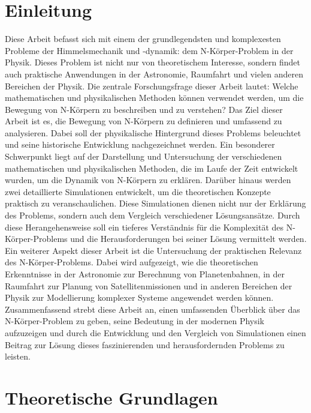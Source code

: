 \documentclass[a4paper,12pt,twoside]{article}
\begin{document}
\section{Einleitung}
Diese Arbeit befasst sich mit einem der grundlegendsten und komplexesten Probleme der Himmelsmechanik und -dynamik: 
dem N-Körper-Problem in der Physik. Dieses Problem ist nicht nur von theoretischem Interesse, 
sondern findet auch praktische Anwendungen in der Astronomie, Raumfahrt und vielen anderen Bereichen der Physik. 
Die zentrale Forschungsfrage dieser Arbeit lautet: Welche mathematischen und physikalischen Methoden können verwendet werden, 
um die Bewegung von N-Körpern zu beschreiben und zu verstehen? 
Das Ziel dieser Arbeit ist es, die Bewegung von N-Körpern zu definieren und umfassend zu analysieren. 
Dabei soll der physikalische Hintergrund dieses Problems beleuchtet und seine historische Entwicklung nachgezeichnet werden. 
Ein besonderer Schwerpunkt liegt auf der Darstellung und Untersuchung der verschiedenen mathematischen und physikalischen Methoden, 
die im Laufe der Zeit entwickelt wurden, um die Dynamik von N-Körpern zu erklären.
Darüber hinaus werden zwei detaillierte Simulationen entwickelt, um die theoretischen Konzepte praktisch zu veranschaulichen. 
Diese Simulationen dienen nicht nur der Erklärung des Problems, sondern auch dem Vergleich verschiedener Lösungsansätze. 
Durch diese Herangehensweise soll ein tieferes Verständnis für die Komplexität des N-Körper-Problems und die Herausforderungen bei seiner Lösung vermittelt werden.
Ein weiterer Aspekt dieser Arbeit ist die Untersuchung der praktischen Relevanz des N-Körper-Problems. 
Dabei wird aufgezeigt, wie die theoretischen Erkenntnisse in der Astronomie zur Berechnung von Planetenbahnen, 
in der Raumfahrt zur Planung von Satellitenmissionen und in anderen Bereichen der Physik zur Modellierung komplexer Systeme angewendet werden können.
Zusammenfassend strebt diese Arbeit an, einen umfassenden Überblick über das N-Körper-Problem zu geben, seine Bedeutung 
in der modernen Physik aufzuzeigen und durch die Entwicklung und den Vergleich von Simulationen einen Beitrag zur Lösung 
dieses faszinierenden und herausfordernden Problems zu leisten.
\newpage


\section{Theoretische Grundlagen}
\end{document}
